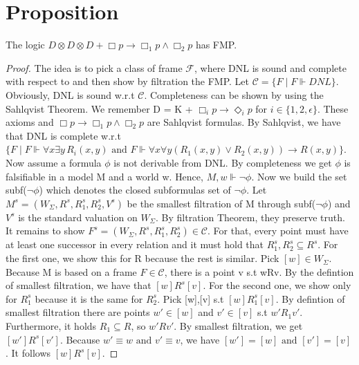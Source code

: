 \documentclass[12pt, a4paper]{scrreprt}
\begin{document}
\section{Proposition}
The logic $D \otimes D \otimes D + \Box p \rightarrow \Box_1 p \land \Box_2 p$ has FMP.
\begin{proof}
The idea is to pick a class of frame $\mathcal{F}$, where DNL is sound and complete with respect to and then show by filtration the FMP. \newline \newline
Let $\mathcal{C} = \{F \mid F \Vdash DNL\}$. Obviously,  DNL is sound w.r.t $\mathcal{C}$. Completeness can be shown by using the Sahlqvist Theorem.
We remember D = K + $\Box_i p \rightarrow \Diamond_i p$ for $i \in \{1,2, \epsilon\}$. These axioms and $\Box p \rightarrow \Box_1 p \land \Box_2 p$ are Sahlqvist formulas. 
By Sahlqvist, we have that DNL is complete w.r.t $\{F \mid F \Vdash \forall x \exists y \, R_i(x,y) \mbox{ and } F \Vdash \forall x \forall y (R_1(x,y) \lor R_2(x,y)) \rightarrow R(x,y)\}$. \newline \newline
Now assume a formula $\phi$ is not derivable from DNL. By completeness we get $\phi$ is falsifiable in a model M and a world w. Hence, $M,w \Vdash \neg \phi$. Now we build the set subf($\neg \phi$) which denotes the closed subformulas set of $\neg \phi$.
Let $M^s = (W_\Sigma, R^s, R^s_1, R^s_2, V^s)$ be the smallest filtration of M through subf($\neg \phi$) and $V^s$ is the standard valuation on $W_\Sigma$. By filtration Theorem, they preserve truth.
It remains to show $F^s = (W_\Sigma, R^s, R^s_1, R^s_2)\in  \mathcal{C}$. For that, every point must have at least one successor in every relation and it must hold that $R^s_1,R^s_2 \subseteq R^s$. For the first one, we show this for R because the rest is similar.
Pick $[w]\in W_\Sigma$. Because M is based on a frame $F \in \mathcal{C}$, there is a point v s.t wRv. By the defintion of smallest filtration, we have that $[w]R^s[v]$. For the second one, we show only for $R^s_1$ because it is the same for $R^s_2$.
Pick [w],[v] s.t $[w]R^s_1[v]$. By defintion of smallest filtration there are points $w' \in [w]$ and $v' \in [v]$ s.t $w'R_1v'$. Furthermore, it holds $R_1 \subseteq R$, so $w'Rv'$.
By smallest filtration, we get $[w']R^s[v']$. Because $w' \equiv w \mbox{ and } v' \equiv v$, we have $[w'] = [w] \mbox{ and } [v'] = [v]$. It follows $[w]R^s[v]$.

\end{proof}
\end{document}
